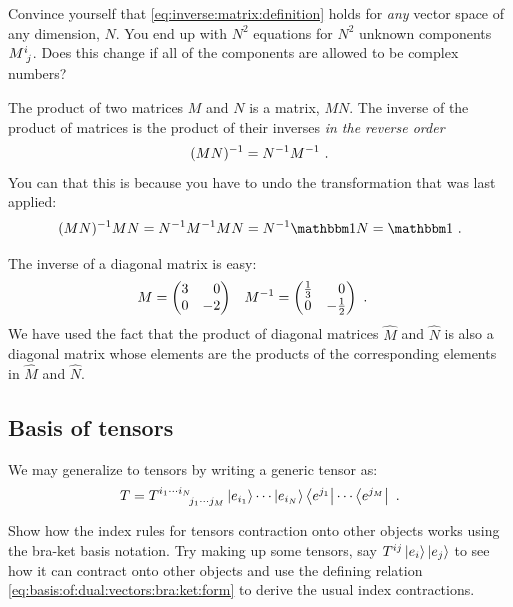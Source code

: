\documentclass[12pt, oneside]{report}    %
\begin{document}
\begin{exercise}
Convince yourself that \eqref{eq:inverse:matrix:definition} holds for \emph{any} vector space of any dimension, $N$. You end up with $N^2$ equations for $N^2$ unknown components $M\aij{i}{j}$. Does this change if all of the components are allowed to be complex numbers?
\end{exercise}


The product of two matrices $M$ and $N$ is a matrix, $MN$. The inverse of the product of matrices is the product of their inverses \emph{in the reverse order}
\begin{align}
    (MN)^{-1} = N^{-1} M^{-1} \ .
\end{align}
You can that this is because you have to undo the transformation that was last applied:
\begin{align}
    (MN)\inv MN = N\inv M\inv MN = N\inv \one  N = \one  \ .
\end{align}




\begin{example}
The inverse of a diagonal matrix is easy:
\begin{align}
    M &=
    \begin{pmatrix}
     3 & \pp  0 \\
     0 & -2
    \end{pmatrix}
    &
    M\inv &=
    \begin{pmatrix}
    \frac{1}{3} & \pp 0 \\
    0 & -\frac{1}{2}
    \end{pmatrix} \ .
\end{align}
We have used the fact that the product of diagonal matrices $\hat M$ and $\hat N$ is also a diagonal matrix whose elements are the products of the corresponding elements in $\hat M$ and $\hat N$.
\end{example}



\subsection{Basis of tensors}

 We may generalize to tensors by writing a generic tensor as:
 \begin{align}
    T =
     T\aij{i_1\cdots i_N}{j_1\cdots j_M}
     \ket{e_{i_1}}\cdots \ket{e_{i_N}}
     \bra{e^{j_1}}\cdots \bra{e^{j_M}} \ .
     \label{eq:tensor:T:with:basis}
 \end{align}
\begin{exercise}
Show how the index rules for tensors contraction onto other objects works using the bra-ket basis notation. Try making up some tensors, say $T^{ij} \left|e_i\right\rangle\left|e_j\right\rangle$ to see how it can contract onto other objects and use the defining relation \eqref{eq:basis:of:dual:vectors:bra:ket:form} to derive the usual index contractions. 
\end{exercise}
\end{document}

